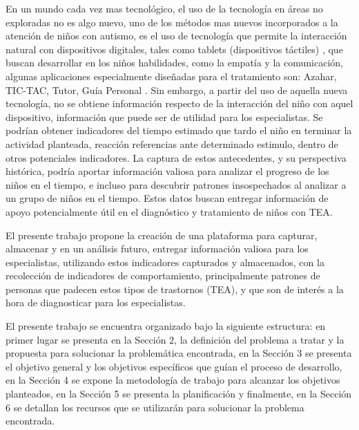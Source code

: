 \documentclass[12pt,letterpaper]{article}
\begin{document}
En un mundo cada vez mas tecnol\'ogico, el uso de la tecnolog\'ia en \'areas 
no exploradas no es algo nuevo, uno de los m\'etodos mas nuevos incorporados 
a la atenci\'on de ni\~nos con autismo, es el uso de tecnolog\'ia que permite 
la interacci\'on natural con dispositivos digitales, tales como tablets 
(dispositivos t\'actiles) \cite{REF5}, que buscan desarrollar en los ni\~nos habilidades, 
como la empat\'ia y la comunicaci\'on, algunas aplicaciones especialmente 
dise\~nadas para el tratamiento son: Azahar, TIC-TAC, Tutor, Gu\'ia Personal \cite{REF8}. 
Sin embargo, a partir del uso de aquella nueva tecnolog\'ia, no se obtiene 
informaci\'on respecto de la interacci\'on del ni\~no con aquel dispositivo, 
informaci\'on que puede ser de utilidad para los especialistas. Se podr\'ian
 obtener indicadores del tiempo estimado que tardo el ni\~no en terminar 
 la actividad planteada, reacci\'on referencias ante determinado estimulo, 
 dentro de otros potenciales indicadores. La captura de estos antecedentes, 
 y su perspectiva hist\'orica, podr\'ia aportar informaci\'on valiosa para 
analizar el progreso de los ni\~nos en el tiempo, e incluso para descubrir 
patrones insospechados al analizar a un grupo de ni\~nos en el tiempo. 
Estos datos buscan entregar informaci\'on de apoyo  potencialmente \'util 
en el diagn\'ostico y tratamiento de ni\~nos con TEA.

El presente trabajo propone la creaci\'on de una plataforma para capturar,
 almacenar y en un an\'alisis futuro, entregar informaci\'on valiosa para 
 los especialistas, utilizando estos indicadores capturados y almacenados, 
 con la recolecci\'on de indicadores de comportamiento, principalmente
  patrones de personas que padecen estos tipos de trastornos (TEA), y 
  que son de inter\'es a la hora de diagnosticar para los especialistas.

El presente trabajo se encuentra organizado bajo la siguiente estructura: 
en primer lugar se presenta en la Secci\'on 2, la definici\'on del problema a 
tratar y la propuesta para solucionar la problem\'atica encontrada, en la 
Secci\'on 3 se presenta el objetivo general y los objetivos espec\'ificos 
que gu\'ian el proceso de desarrollo, en la Secci\'on 4 se expone la metodolog\'ia 
de trabajo para alcanzar los objetivos planteados, en la Secci\'on 5 se 
presenta la planificaci\'on y finalmente, en la Secci\'on 6 se detallan los
 recursos que se utilizar\'an para solucionar la problema encontrada. 
\end{document}
